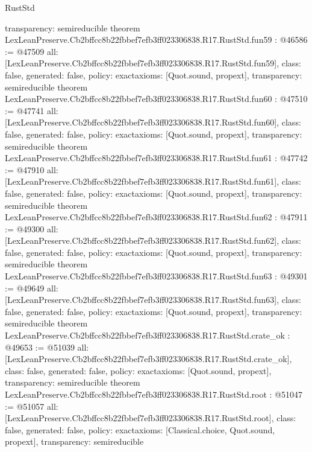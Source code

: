 \begin{lexlean}{RustStd}
\begin{coremodule}
{  transparency: semireducible
}
theorem LexLeanPreserve.Cb2bffcc8b22fbbef7efb3ff023306838.R17.RustStd.fun59 : @46586 := @47509 {
  all: [LexLeanPreserve.Cb2bffcc8b22fbbef7efb3ff023306838.R17.RustStd.fun59],
  class: false,
  generated: false,
  policy: exact{axioms: [Quot.sound, propext]},
  transparency: semireducible
}
theorem LexLeanPreserve.Cb2bffcc8b22fbbef7efb3ff023306838.R17.RustStd.fun60 : @47510 := @47741 {
  all: [LexLeanPreserve.Cb2bffcc8b22fbbef7efb3ff023306838.R17.RustStd.fun60],
  class: false,
  generated: false,
  policy: exact{axioms: [Quot.sound, propext]},
  transparency: semireducible
}
theorem LexLeanPreserve.Cb2bffcc8b22fbbef7efb3ff023306838.R17.RustStd.fun61 : @47742 := @47910 {
  all: [LexLeanPreserve.Cb2bffcc8b22fbbef7efb3ff023306838.R17.RustStd.fun61],
  class: false,
  generated: false,
  policy: exact{axioms: [Quot.sound, propext]},
  transparency: semireducible
}
theorem LexLeanPreserve.Cb2bffcc8b22fbbef7efb3ff023306838.R17.RustStd.fun62 : @47911 := @49300 {
  all: [LexLeanPreserve.Cb2bffcc8b22fbbef7efb3ff023306838.R17.RustStd.fun62],
  class: false,
  generated: false,
  policy: exact{axioms: [Quot.sound, propext]},
  transparency: semireducible
}
theorem LexLeanPreserve.Cb2bffcc8b22fbbef7efb3ff023306838.R17.RustStd.fun63 : @49301 := @49649 {
  all: [LexLeanPreserve.Cb2bffcc8b22fbbef7efb3ff023306838.R17.RustStd.fun63],
  class: false,
  generated: false,
  policy: exact{axioms: [Quot.sound, propext]},
  transparency: semireducible
}
theorem LexLeanPreserve.Cb2bffcc8b22fbbef7efb3ff023306838.R17.RustStd.crate_ok : @49653 := @51039 {
  all: [LexLeanPreserve.Cb2bffcc8b22fbbef7efb3ff023306838.R17.RustStd.crate_ok],
  class: false,
  generated: false,
  policy: exact{axioms: [Quot.sound, propext]},
  transparency: semireducible
}
theorem LexLeanPreserve.Cb2bffcc8b22fbbef7efb3ff023306838.R17.RustStd.root : @51047 := @51057 {
  all: [LexLeanPreserve.Cb2bffcc8b22fbbef7efb3ff023306838.R17.RustStd.root],
  class: false,
  generated: false,
  policy: exact{axioms: [Classical.choice, Quot.sound, propext]},
  transparency: semireducible
}


\end{coremodule}
\end{lexlean}
